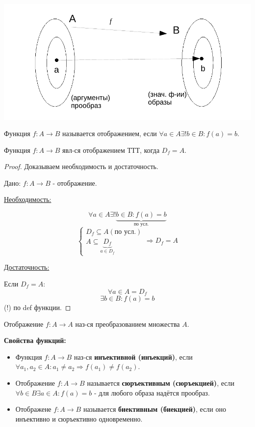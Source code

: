 \includegraphics[scale=0.7]{./media/proobraz.pdf}

\begin{definition}[Отображения]
	Функция $f: A \to B$ называется отображением, если $\forall a \in A \exists ! b \in B: f(a) = b.$
\end{definition}

\begin{theorem}
	Функция $f: A \to B$ явл-ся отображением ТТТ, когда $D_f = A$.
\end{theorem}

\begin{proof}
	Доказываем необходимость и достаточность.
	
	Дано: $f: A \to B$ - отображение.
	
	\underline{Необходимость:}
	
	\[ \forall a \in A \exists ! \underbrace{b \in B: f(a) = b}_{\text{по усл.}} \]
	\[
	\begin{cases}
		D_f \subseteq A (\text{по усл.}) \\
		A \subseteq \underbrace{D_f}_{a \in D_f}
	\end{cases}
	\Rightarrow D_f = A
	\]
	
	\underline{Достаточность:}
	
	Если $D_f = A$:
	\[ \forall a \in A = D_f \]
	\[ \exists b \in B: f(a) = b \]
	(!) по def функции.
\end{proof}

\begin{definition}
	Отображение $f: A \to A$ наз-ся преобразованием множества $A$.
\end{definition}

\textbf{Свойства функций:}

\begin{itemize}
	\item Функция $f: A \to B$ наз-ся \textbf{инъективной (инъекций)}, если $\forall a_1, a_2 \in A: a_1 \ne a_2 \Rightarrow f(a_1) \ne f(a_2)$.
	\item Отображение $f: A \to B$ называется \textbf{сюръективным (сюръекцией)}, если $\forall b \in B \exists a \in A: f(a) = b$ - для любого образа надётся прообраз.
	\item Отображене $f: A \to B$ называется \textbf{биективным (биекцией)}, если оно инъективно и сюръективно одновременно.
\end{itemize}

